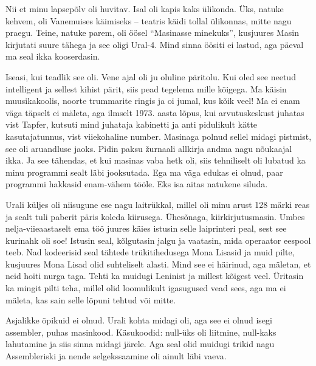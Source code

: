 Nii et minu lapsepõlv oli huvitav. Isal oli kapis kaks ülikonda. 
Üks, natuke kehvem, oli Vanemuises käimiseks -- teatris käidi tollal ülikonnas, 
mitte nagu praegu. Teine, natuke parem, oli öösel \enquote{Masinasse 
minekuks}, kusjuures Masin kirjutati suure tähega ja see oligi 
Ural-4. Mind sinna öösiti ei lastud, aga päeval ma seal 
ikka kooserdasin. 


Iseasi, kui teadlik see oli. Vene ajal oli ju oluline 
päritolu. Kui oled see neetud intelligent ja sellest kihist pärit, 
siis pead tegelema mille kõigega. Ma käisin muusikakoolis, noorte trummarite 
ringis ja oi jumal, kus kõik veel! Ma ei enam väga täpselt ei mäleta, aga 
ilmselt 1973. aasta lõpus, kui arvutuskeskust juhatas vist Tapfer, kutsuti mind juhataja kabinetti ja anti pidulikult kätte kasutajatunnus, vist
viiekohaline number. Masinaga polnud sellel midagi pistmist, 
see oli aruandluse jaoks. Pidin paksu žurnaali allkirja 
andma nagu nõukaajal ikka. Ja see tähendas, et kui masinas 
vaba hetk oli, siis tehniliselt oli lubatud ka minu programmi sealt läbi 
jooksutada. Ega ma väga edukas ei olnud, paar programmi hakkasid
enam-vähem tööle. Eks isa aitas natukene siluda.

Urali küljes oli niisugune 
ese nagu laitrükkal, millel oli minu arust 128 märki reas 
ja sealt tuli paberit päris koleda kiirusega. Ühesõnaga, kiirkirjutusmasin. Umbes nelja-viieaastaselt ema töö
juures käies istusin selle laiprinteri peal, sest see kurinahk oli soe! 
Istusin seal, kõlgutasin jalgu ja vaatasin, mida operaator 
eespool teeb. Nad kodeerisid seal tähtede 
trükitihedusega Mona Lisasid ja muid pilte, kusjuures Mona Lisad 
olid suhteliselt alasti. Mind see ei häirinud, aga mäletan, et
neid hoiti nurga taga. Tehti ka muidugi Leninist ja millest kõigest veel. Üritasin 
ka mingit pilti teha, millel olid loomulikult igasugused vead sees, aga ma ei 
mäleta, kas sain selle lõpuni tehtud või mitte. 


Asjalikke õpikuid ei olnud. Urali kohta midagi oli, aga 
see ei olnud isegi assembler, puhas masinkood. Käsukoodid: 
null-üks oli liitmine, null-kaks lahutamine ja siis 
sinna midagi järele. Aga seal olid muidugi trikid nagu Assembleriski ja nende 
selgekssaamine oli ainult läbi vaeva. 

